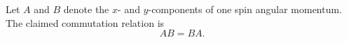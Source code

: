 \documentclass{article}
\begin{document}
Let $A$ and $B$ denote the $x$- and $y$-components of one spin angular
momentum.  The claimed commutation relation is
\begin{equation}
A B = B A .
\label{eq:operator-commutator}
\end{equation}
\end{document}
